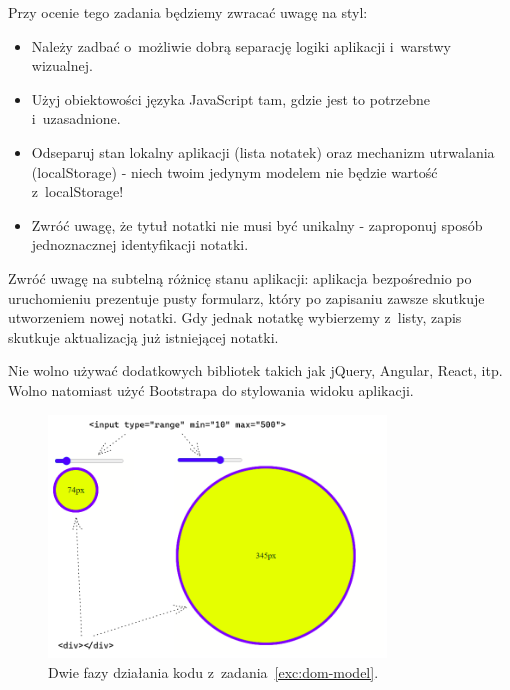 \documentclass[12pt]{article}
\begin{document}
\begin{enumerate}
            Przy ocenie tego zadania będziemy zwracać uwagę na styl:
            \begin{itemize}
                \item Należy zadbać o~możliwie dobrą separację logiki aplikacji i~warstwy wizualnej.
                \item Użyj obiektowości języka JavaScript tam, gdzie jest to potrzebne i~uzasadnione.
                \item Odseparuj stan lokalny aplikacji (lista notatek) oraz mechanizm utrwalania (localStorage) - niech twoim jedynym modelem nie będzie wartość z~localStorage!
                \item Zwróć uwagę, że tytuł notatki nie musi być unikalny - zaproponuj sposób jednoznacznej identyfikacji notatki.
            \end{itemize}

            Zwróć uwagę na subtelną różnicę stanu aplikacji: aplikacja bezpośrednio po uruchomieniu prezentuje pusty formularz, który po zapisaniu zawsze skutkuje utworzeniem nowej notatki. Gdy jednak notatkę wybierzemy z~listy, zapis skutkuje aktualizacją już istniejącej notatki.

            Nie wolno używać dodatkowych bibliotek takich jak jQuery, Angular, React, itp. Wolno natomiast użyć Bootstrapa do stylowania widoku aplikacji.

            \begin{figure}[p]
                \centering
                \includegraphics[width=0.8\textwidth]{lista-2-1}
                \caption{Dwie fazy działania kodu z~zadania~\ref{exc:dom-model}.}
                \label{fig:dom-model}
            \end{figure}


\end{enumerate}
\end{document}
